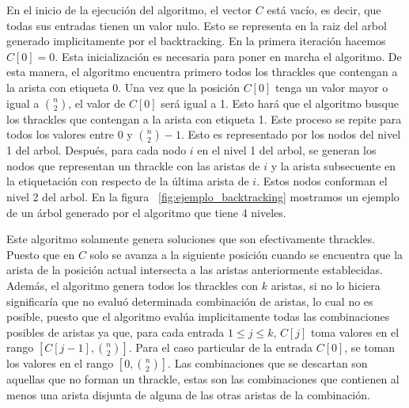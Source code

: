   En el  inicio de la ejecución del algoritmo, el vector $C$ está vacío, es
  decir, que  todas sus entradas tienen un valor nulo. Esto se representa en
  la raiz del arbol generado implicitamente por el backtracking. En la primera iteración
  hacemos $C[0] = 0$. Esta inicialización es necesaria para poner
  en marcha el algoritmo. De esta manera, el algoritmo encuentra primero todos
  los thrackles que contengan a la arista con etiqueta 0. Una vez que la
  posición $C[0]$ tenga un valor mayor o igual a $\binom{n}{2}$, el valor de
  $C[0]$ será igual a 1. Esto hará que el algoritmo busque los thrackles que
  contengan a la arista con etiqueta 1. Este proceso se repite para todos los
  valores entre $0$ y $\binom{n}{2}-1$. Esto es representado por los nodos del nivel 1
  del arbol. Después, para cada nodo $i$ en el nivel 1 del arbol, se generan los nodos
  que representan un thrackle con las aristas de $i$ y la arista subsecuente en la etiquetación
  con respecto de la última arista de $i$. Estos nodos conforman el nivel 2 del arbol. En la figura
  ~\ref{fig:ejemplo_backtracking} mostramos un ejemplo de un árbol generado por el algoritmo que
  tiene 4 niveles.

  Este algoritmo solamente genera soluciones que son efectivamente thrackles.
  Puesto que en $C$ solo se avanza a la siguiente posición
  cuando se encuentra que la arista de la posición actual intersecta a las
  aristas anteriormente establecidas. Además, el algoritmo genera todos los
  thrackles con $k$ aristas, si no lo hiciera significaría que no evaluó
  determinada combinación de aristas, lo cual no es posible, puesto que el algoritmo
  evalúa implicitamente todas las combinaciones posibles de aristas ya que, para
  cada entrada $1\leq j\leq k$, $C[j]$ toma valores en el rango
  $\left[C[j-1],\binom{n}{2}\right]$. Para el caso particular de la entrada
  $C[0]$, se toman los valores en el rango $\left[ 0, \binom{n}{2}\right]$. Las
  combinaciones que se descartan son aquellas que no forman un thrackle,
  estas son las combinaciones que contienen al menos una arista disjunta de
  alguna de las otras aristas de la combinación.

